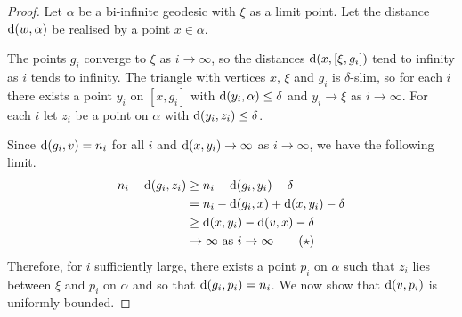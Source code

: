 \documentclass[a4paper]{article}
\begin{document}
\begin{proof}
  Let $\alpha$ be a bi-infinite geodesic with $\xi$ as a limit point. 
  Let the distance $\operatorname{d}(w,\alpha)$ be realised by a point $x \in \alpha$.

  The points $g_i$ converge to $\xi$ as $i\to\infty$, so the distances
  $\operatorname{d}(x, [\xi, g_i])$ tend to infinity as $i$ tends to infinity. The
  triangle with vertices $x$, $\xi$ and $g_i$ is $\delta$-slim, so for each $i$
  there exists a point $y_i$ on $[x, g_i]$ with $\operatorname{d}(y_i, \alpha) \leq
  \delta$ and $y_i\to\xi$ as $i\to\infty$.  For each $i$ let $z_i$ be a point
  on $\alpha$ with $\operatorname{d}(y_i, z_i) \leq \delta$.

  Since $\operatorname{d}(g_i, v) = n_i$ for all $i$ and $\operatorname{d}(x,y_i) \to
  \infty$ as $i\to\infty$, we have the following limit.
  \begin{align*}\label{eqn:zi_closer_to_gi_than_x}
    n_i - \operatorname{d}(g_i, z_i) & \geq n_i - \operatorname{d}(g_i, y_i) - \delta \\
                          &= n_i - \operatorname{d}(g_i, x) + \operatorname{d}(x, y_i) - \delta\\
                          &\geq \operatorname{d}(x, y_i) - \operatorname{d}(v,x) - \delta\\
                          &\to \infty\text{ as $i \to \infty$}\tag{$\star$}
  \end{align*}
  Therefore, for $i$ sufficiently large, there exists a point $p_i$ on $\alpha$
  such that $z_i$ lies between $\xi$ and $p_i$ on $\alpha$ and so that
  $\operatorname{d}(g_i,p_i)=n_i$. We now show that $\operatorname{d}(v, p_i)$ is uniformly bounded.


\end{proof}
\end{document}
